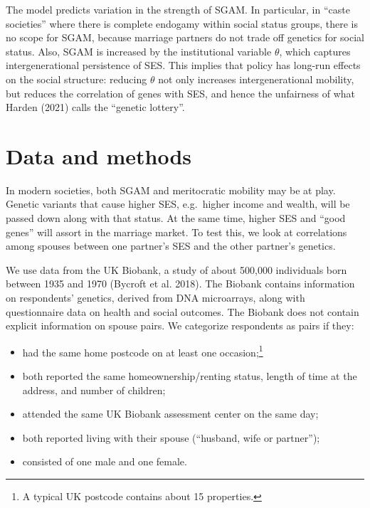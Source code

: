 \documentclass[
]{article}
\providecommand{\tightlist}{%
  \setlength{\itemsep}{0pt}\setlength{\parskip}{0pt}}
\theoremstyle{definition}
\theoremstyle{definition}
\theoremstyle{definition}
\theoremstyle{definition}
\theoremstyle{remark}
\begin{document}
The model predicts variation in the strength of SGAM. In particular, in
``caste societies'' where there is complete endogamy within social status
groups, there is no scope for SGAM, because marriage partners do not
trade off genetics for social status. Also, SGAM is increased by the institutional variable \(\theta\), which captures intergenerational persistence of SES. This
implies that policy has long-run effects on the social structure: reducing
\(\theta\) not only increases intergenerational mobility, but reduces
the correlation of genes with SES, and hence the unfairness of what
Harden (2021) calls the ``genetic lottery''.

\hypertarget{data-and-methods}{%
\section{Data and methods}\label{data-and-methods}}

In modern societies, both SGAM and meritocratic mobility may be at play. Genetic
variants that cause higher SES, e.g.~higher income and wealth,
will be passed down along with that status. At the same time, higher SES and ``good
genes'' will assort in the marriage market. To test this, we look at correlations
among spouses between one partner's SES and the other partner's genetics.

We use data from the UK Biobank, a study of about 500,000 individuals born
between 1935 and 1970 (Bycroft et al. 2018). The Biobank contains information on respondents'
genetics, derived from DNA microarrays, along with questionnaire data on health
and social outcomes. The Biobank does not contain explicit information on spouse
pairs. We categorize respondents as pairs if they:

\begin{itemize}
\tightlist
\item
  had the same home postcode on at least one occasion;\footnote{A typical UK postcode contains about 15 properties.}
\item
  both reported the same homeownership/renting status, length of time
  at the address, and number of children;
\item
  attended the same UK Biobank assessment center on the same day;
\item
  both reported living with their spouse (``husband, wife or partner'');
\item
  consisted of one male and one female.
\end{itemize}
\end{document}
